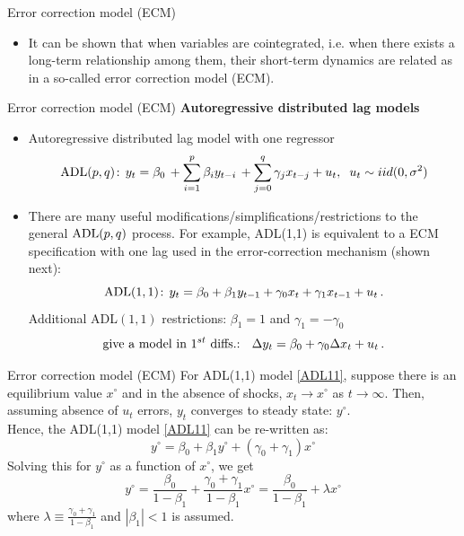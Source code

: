 \documentclass{beamer}
\begin{document}
\begin{frame}{Error correction model (ECM)}
\begin{itemize}
\item It can be shown that when variables are cointegrated, i.e. when there exists a long-term relationship among them, their short-term dynamics are related as in a so-called error correction model (ECM).
\end{itemize}
\end{frame}
\begin{frame}{Error correction model (ECM)}
\textbf{Autoregressive distributed lag models}\\
\medskip
\begin{itemize}
\item Autoregressive distributed lag model with one regressor
$$\textnormal{ADL}(p,q)\!: \, y_t = \beta_0 \, + \sum_{i=1}^p \beta_i y_{t-i} \, + 
         \sum_{j=0}^q \gamma_j x_{t-j} + u_t, \hspace{0.2cm}
         u_t \sim iid(0,\sigma^2)$$
\item There are many useful modifications/simplifications/restrictions to the general $\textnormal{ADL}(p,q)$ process. For example, ADL(1,1) is equivalent to a ECM specification with one lag used in the error-correction mechanism (shown next):
\begin{equation} \label{ADL11}
\textnormal{ADL}(1,1)\!: \, y_t = \beta_0 + \beta_1 y_{t-1} + 
         \gamma_0 x_t + \gamma_1 x_{t-1} + u_t \,.
\end{equation}
Additional ADL$(1,1)$ restrictions: $\beta_1 = 1$ and $\gamma_1 = -\gamma_0$
$$\textnormal{give a model in $1^{st}$ diffs.: } \,\,\, \Delta y_t = \beta_0 + \gamma_0 \Delta x_t + u_t\,. $$
\end{itemize}
\end{frame}
\begin{frame}{Error correction model (ECM)}
For ADL(1,1) model \eqref{ADL11}, suppose there is an equilibrium value $x^{\circ}$ and in the absence of shocks, $x_t \rightarrow x^{\circ}$ as $t \rightarrow \infty$. Then, assuming absence of $u_t$ errors, $y_t$ converges to steady state: $y^{\circ}$.\\ 
\medskip
Hence, the ADL(1,1) model \eqref{ADL11} can be re-written as:
$$y^{\circ} = \beta_0 + \beta_1 y^{\circ} + (\gamma_0 + \gamma_1) x^{\circ}$$
Solving this for $y^{\circ}$ as a function of $x^{\circ}$, we get
$$ y^{\circ} = 
   \frac{\beta_0}{1 - \beta_1} + \frac{\gamma_0 + \gamma_1}{1 - \beta_1} x^{\circ} = 
   \frac{\beta_0}{1 - \beta_1} + \lambda x^{\circ}$$
where $ \lambda \equiv \frac{\gamma_0 + \gamma_1}{1 - \beta_1}$ and $|\beta_1|<1$ is assumed. \\
\end{frame}
\end{document}
